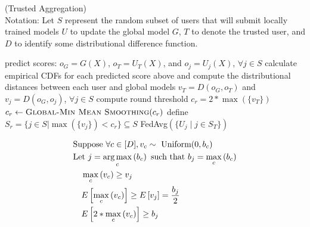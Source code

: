 \documentclass{article} %
\begin{document}
\begin{algorithm}[H]
\caption{ (Trusted Aggregation) \\ 
Notation: Let $S$ represent the random subset of users that will submit locally trained models $U$ to update the global model $G$, $T$ to denote the trusted user, and $D$ to identify some distributional difference function.
}
\label{alg:t-agg}
\begin{algorithmic}[1]

            \State predict scores: $o_G = G(X)$, $o_{T} = U_T(X)$, and $o_j = U_j(X)$, $\forall j \in S$
            \State calculate empirical CDFs for each predicted score above 
            \State \quad and compute the distributional distances between each user and global models 
            \State \quad $v_T = D(o_G, o_T)$ and $v_{j} = D(o_G, o_{j})$, $\forall j \in S$
        \EndFor
        \State compute round threshold $c_r = 2 * \max ( \{v_T\} )$
        \State  $c_r \gets \Call{Global-Min Mean Smoothing}{c_r}$  
        \State define $S_r = \{j \in S | \max (\{v_{j}\}) < c_r \} \subseteq S$
        \State \Return FedAvg$(\{U_j \mid j \in S_T \})$ 
    \EndProcedure
\end{algorithmic}
\end{algorithm}


%
\begin{figure}
\begin{align}
    & \textrm{Suppose } \forall c \in \mathopen[ D \mathclose], v_c \sim \textrm{ Uniform}(0, b_c) \nonumber \\
    & \textrm{Let } j = \operatorname*{arg\,max}_c \left( b_c \right) \textrm{ such that } b_j = \max_c \left( b_c \right) \nonumber \\
    & \quad \max_c \left( v_c \right) \geq v_j \nonumber \\
    & \quad E \left[ \max_c \left( v_c \right) \right] \geq E \left[ v_j \right] = \dfrac{b_j}{2} \nonumber \\
    & \quad E \left[ 2 * \max_c \left( v_c \right) \right] \geq b_j \label{eq:geq_bound} 
\end{align}
\end{figure}
\end{document}
